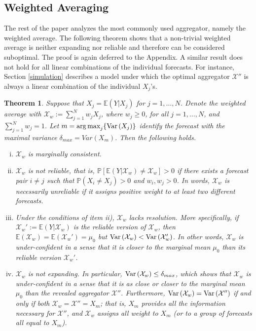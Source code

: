 \documentclass[11pt]{article}
\renewcommand{\P}{\mathbb{P}}
\newcommand{\E}{\mathbb{E}}
\newtheorem{theorem}{Theorem}[section]
\DeclareMathOperator*{\argmax}{arg\,max}
\theoremstyle{definition}
\theoremstyle{definition}
\def\P{{\mathbb P}}
\def\E{{\mathbb E}}
\def\Var{{\rm Var}\,}
\begin{document}
\subsection{Weighted Averaging} \label{contraction}

The rest of the paper analyzes the most commonly used aggregator, namely the weighted average. The following theorem shows that a non-trivial weighted average is neither expanding nor reliable and therefore can be considered suboptimal. The proof is again deferred to the Appendix. A similar result does not hold for all linear combinations of the individual forecasts. For instance, Section \ref{simulation} describes a model under which the optimal aggregator $\mathcal{X}''$ is always a linear combination of the individual $X_j$'s.




\begin{theorem}\label{contraction}
Suppose that $X_j = \E(Y | X_j)$ for $j = 1, \dots, N$. Denote the weighted average with $\mathcal{X}_w := \sum_{j=1}^N w_jX_j$, where  $w_j \geq 0$, for all $j = 1, \dots, N$, and $\sum_{j=1}^N w_j = 1$.  Let $m = \argmax_j \{ \Var(X_j)  \}$ identify the forecast with the maximal variance $\delta_{max} = Var(X_m)$. Then the following holds.
\begin{enumerate}[i)]
\item  $\mathcal{X}_w$ is marginally consistent.

\item $\mathcal{X}_w$ is not reliable, that is, $\P\left[\E(Y | \mathcal{X}_w) \neq \mathcal{X}_w\right] > 0$ if there exists a forecast pair $i \neq j$ such that $\P(X_i \neq X_j) > 0$ and $w_i, w_j > 0$. In words, $\mathcal{X}_w$ is necessarily unreliable if it assigns positive weight to at least two different forecasts. 
 
 \item Under the conditions of item ii), $\mathcal{X}_w$ lacks resolution. More specifically, if $\mathcal{X}_w' :=  \E(Y| \mathcal{X}_w)$ is the reliable version of $\mathcal{X}_w$, then $\E(\mathcal{X}_w) = \E(\mathcal{X}_w') = \mu_0$ but $\Var(\mathcal{X}_w) < \Var(\mathcal{X}_w')$. In other words, $\mathcal{X}_w$ is under-confident in a sense that it is closer to the marginal mean $\mu_0$ than its reliable version $\mathcal{X}_w'$. \label{underconfA}
 
\item $\mathcal{X}_w$ is not expanding. In particular, $\Var(\mathcal{X}_w) \leq \delta_{max}$, which shows that $\mathcal{X}_w$ is under-confident in a sense that it is as close or closer to the marginal mean $\mu_0$ than the revealed aggregator $\mathcal{X}''$.  Furthermore, $\Var(\mathcal{X}_w) = \Var(\mathcal{X}'')$ if and only if both $\mathcal{X}_w = \mathcal{X}'' = X_m$; that is,  $X_m$ provides all the information necessary for $\mathcal{X}''$, and $\mathcal{X}_w$ assigns all weight to $X_m$ (or to a group of forecasts all equal to $X_m$). \label{underconfB}
\end{enumerate}
\end{theorem}
\end{document}
